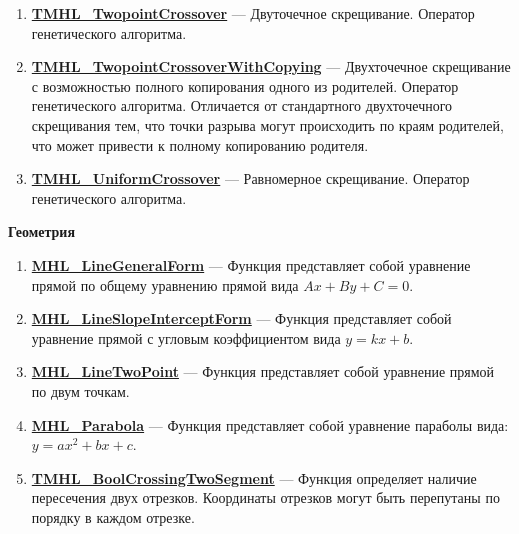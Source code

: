 \documentclass[a4paper,12pt]{article}
\begin{document}
\begin{enumerate}
\item \textbf{\hyperref[TMHL_TwopointCrossover]{TMHL\_TwopointCrossover}} --- Двуточечное скрещивание. Оператор генетического алгоритма.

\item \textbf{\hyperref[TMHL_TwopointCrossoverWithCopying]{TMHL\_TwopointCrossoverWithCopying}} --- Двухточечное скрещивание с возможностью полного копирования одного из родителей. Оператор генетического алгоритма. Отличается от стандартного двухточечного скрещивания тем, что точки разрыва могут происходить по краям родителей, что может привести к полному копированию родителя.

\item \textbf{\hyperref[TMHL_UniformCrossover]{TMHL\_UniformCrossover}} --- Равномерное скрещивание. Оператор генетического алгоритма.

\end{enumerate}

\textbf{Геометрия}
\begin{enumerate}

\item \textbf{\hyperref[MHL_LineGeneralForm]{MHL\_LineGeneralForm}} --- Функция представляет собой уравнение прямой по общему уравнению прямой вида $Ax+By+C=0$.

\item \textbf{\hyperref[MHL_LineSlopeInterceptForm]{MHL\_LineSlopeInterceptForm}} --- Функция представляет собой уравнение прямой с угловым коэффициентом вида $y=kx+b$.

\item \textbf{\hyperref[MHL_LineTwoPoint]{MHL\_LineTwoPoint}} --- Функция представляет собой уравнение прямой по двум точкам.

\item \textbf{\hyperref[MHL_Parabola]{MHL\_Parabola}} --- Функция представляет собой уравнение параболы вида: $y=ax^2+bx+c$.

\item \textbf{\hyperref[TMHL_BoolCrossingTwoSegment]{TMHL\_BoolCrossingTwoSegment}} --- Функция определяет наличие пересечения двух отрезков. Координаты отрезков могут быть перепутаны по порядку в каждом отрезке.

\end{enumerate}
\end{document}
